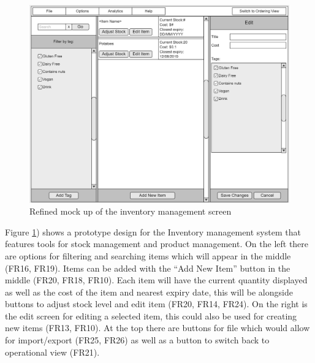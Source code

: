 \pagebreak

\begin{figure}[H]
	\centering
	\includegraphics[width=150mm]{images/GUI_prototypes/Inventory_screen.png}
	\caption{Refined mock up of the inventory management screen}
	\label{fig:management_screen_moqueup}
\end{figure}

Figure \ref{fig:management_screen_moqueup}) shows a prototype design for the Inventory management system that features tools for stock management and product management. On the left there are options for filtering and searching items which will appear in the middle (FR16, FR19). Items can be added with the “Add New Item” button in the middle (FR20, FR18, FR10). Each item will have the current quantity displayed as well as the cost of the item and nearest expiry date, this will be alongside buttons to adjust stock level and edit item (FR20, FR14, FR24). On the right is the edit screen for editing a selected item, this could also be used for creating new items (FR13, FR10). At the top there are buttons for file which would allow for import/export (FR25, FR26) as well as a button to switch back to operational view (FR21).